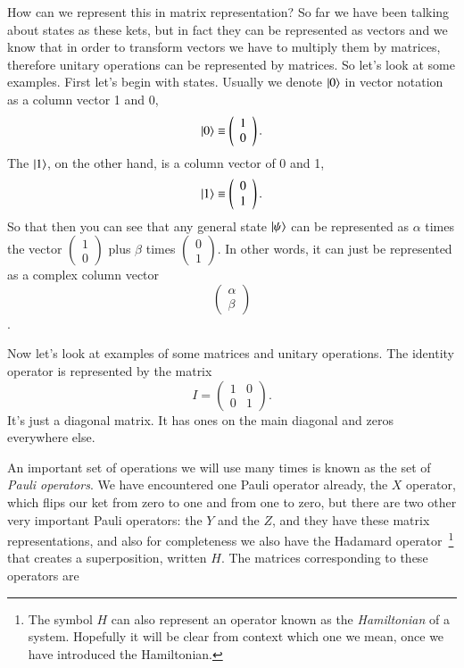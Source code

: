 How can we represent this in matrix representation? So far we have been talking about states as these kets, but in fact they can be represented as vectors and we know that in order to transform vectors we have to multiply them by matrices, therefore unitary operations can be represented by matrices. So let's look at some examples. First let's begin with states. Usually we denote $\left| 0 \right\rangle$ in vector notation as a column vector 1 and 0,
\begin{equation}
\left| 0 \right\rangle\equiv\left(\begin{array}{l}
1 \\
0
\end{array}\right).
\end{equation}
The $\left| 1 \right\rangle$, on the other hand, is a column vector of 0 and 1,
\begin{equation}
\left| 1 \right\rangle\equiv\left(\begin{array}{l}
0 \\
1
\end{array}\right).
\end{equation}
So that then you can see that any general state $\left| \psi \right\rangle$ can be represented as $\alpha$ times the vector $\left(\begin{array}{l}
1 \\
0
\end{array}\right)$ plus $\beta$ times $\left(\begin{array}{l}
0 \\
1
\end{array}\right)$. In other words, it can just be represented as a complex column vector $$\left(\begin{array}{l}
\alpha \\
\beta
\end{array}\right)$$.

Now let's look at examples of some matrices and unitary operations. The identity operator is represented by the matrix
\begin{equation}
I=\left(\begin{array}{ll}
1 & 0 \\
0 & 1
\end{array}\right).
\end{equation}
It's just a diagonal matrix. It has ones on the main diagonal and zeros everywhere else.

An important set of operations we will use many times is known as the set of \emph{Pauli operators}. We have encountered one Pauli operator already, the $X$ operator, which flips our ket from zero to one and from one to zero, but there are two other very important Pauli operators: the $Y$ and the $Z$, and they have these matrix representations, and also for completeness we also have the Hadamard operator~\footnote{The symbol $H$ can also represent an operator known as the \emph{Hamiltonian} of a system.  Hopefully it will be clear from context which one we mean, once we have introduced the Hamiltonian.} that creates a superposition, written $H$.  The matrices corresponding to these operators are


